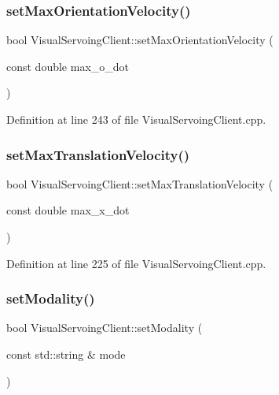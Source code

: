 \subsubsection{\texorpdfstring{set\+Max\+Orientation\+Velocity()}{setMaxOrientationVelocity()}}
{\footnotesize\ttfamily bool Visual\+Servoing\+Client\+::set\+Max\+Orientation\+Velocity (\begin{DoxyParamCaption}\item[{const double}]{max\+\_\+o\+\_\+dot }\end{DoxyParamCaption})\hspace{0.3cm}{\ttfamily [override]}}



Definition at line 243 of file Visual\+Servoing\+Client.\+cpp.

\mbox{\label{classVisualServoingClient_acf12ca40f4a4070f8c6ed36b21c0e9e4}} 
\subsubsection{\texorpdfstring{set\+Max\+Translation\+Velocity()}{setMaxTranslationVelocity()}}
{\footnotesize\ttfamily bool Visual\+Servoing\+Client\+::set\+Max\+Translation\+Velocity (\begin{DoxyParamCaption}\item[{const double}]{max\+\_\+x\+\_\+dot }\end{DoxyParamCaption})\hspace{0.3cm}{\ttfamily [override]}}



Definition at line 225 of file Visual\+Servoing\+Client.\+cpp.

\mbox{\label{classVisualServoingClient_a4b8e26dc7c8afa9b343947894ff214aa}} 
\subsubsection{\texorpdfstring{set\+Modality()}{setModality()}}
{\footnotesize\ttfamily bool Visual\+Servoing\+Client\+::set\+Modality (\begin{DoxyParamCaption}\item[{const std\+::string \&}]{mode }\end{DoxyParamCaption})\hspace{0.3cm}{\ttfamily [override]}}



